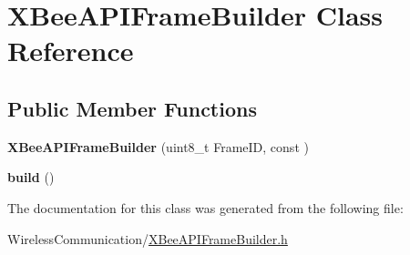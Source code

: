 \hypertarget{class_x_bee_a_p_i_frame_builder}{}\section{X\+Bee\+A\+P\+I\+Frame\+Builder Class Reference}
\label{class_x_bee_a_p_i_frame_builder}
\subsection*{Public Member Functions}
\begin{DoxyCompactItemize}
\item 
\hypertarget{class_x_bee_a_p_i_frame_builder_a7cbca7791e2fe53d237648d38010c147}{}{\bfseries X\+Bee\+A\+P\+I\+Frame\+Builder} (uint8\+\_\+t Frame\+I\+D, const )\label{class_x_bee_a_p_i_frame_builder_a7cbca7791e2fe53d237648d38010c147}

\item 
\hypertarget{class_x_bee_a_p_i_frame_builder_af0bcd1cf3efac52cef4775ccd2d05144}{}{\bfseries build} ()\label{class_x_bee_a_p_i_frame_builder_af0bcd1cf3efac52cef4775ccd2d05144}

\end{DoxyCompactItemize}


The documentation for this class was generated from the following file\+:\begin{DoxyCompactItemize}
\item 
Wireless\+Communication/\hyperlink{_x_bee_a_p_i_frame_builder_8h}{X\+Bee\+A\+P\+I\+Frame\+Builder.\+h}\end{DoxyCompactItemize}

